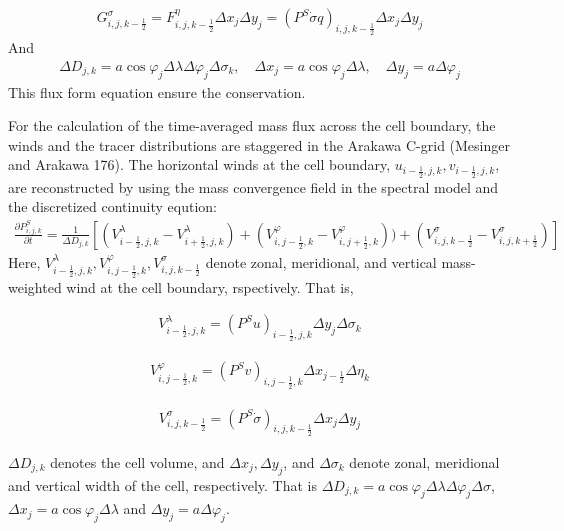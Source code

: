 \begin{eqnarray}G^{\sigma}_{i,j,k-\frac{1}{2}}=F^{\eta}_{i,j,k-\frac{1}{2}} \Delta x_{j} \Delta y_{j}=(P^{S} \dot{\sigma} q)_{i,j,k-\frac{1}{2}} \Delta x_{j} \Delta y_{j}\end{eqnarray} And
\begin{eqnarray}\Delta D_{j,k}=a \cos \varphi_{j} \Delta \lambda \Delta \varphi_{j} \Delta \sigma_{k},\quad \Delta x_{j}=a \cos \varphi_{j} \Delta \lambda,\quad \Delta y_{j}=a \Delta \varphi_{j}\end{eqnarray} This flux form
equation ensure the conservation.

For the calculation of the time-averaged mass flux across the cell boundary, the winds and the tracer distributions are staggered in the Arakawa C-grid (Mesinger and Arakawa 176). The horizontal winds
at the cell boundary, \(u_{i-\frac{1}{2},j,k}, v_{i-\frac{1}{2},j,k}\), are reconstructed by using the mass convergence field in the spectral model and the discretized continuity eqution:
\begin{eqnarray}\frac{\partial P^{S}_{i,j,k} }{\partial t}=\frac{1}{\Delta D_{j,k}}[(V^{\lambda}_{i-\frac{1}{2},j,k}-V^{\lambda}_{i+\frac{1}{2},j,k})+(V^{\varphi}_{i,j-\frac{1}{2},k}-V^{\varphi}_{i,j+\frac{1}{2},k}))+(V^{\sigma}_{i,j,k-\frac{1}{2}}-V^{\sigma}_{i,j,k+\frac{1}{2}})]\end{eqnarray}
Here, \(V^{\lambda}_{i-\frac{1}{2},j,k}, V^{\varphi}_{i,j-\frac{1}{2},k}, V^{\sigma}_{i,j,k-\frac{1}{2}}\) denote zonal, meridional, and vertical mass-weighted wind at the cell boundary, rspectively.
That is,

\begin{eqnarray}
V^{\lambda}_{i-\frac{1}{2},j,k}=(P^{S}u)_{i-\frac{1}{2},j,k} \Delta y_{j} \Delta \sigma_{k}
\end{eqnarray}

\begin{eqnarray}
V^{\varphi}_{i,j-\frac{1}{2},k}=(P^{S}v)_{i,j-\frac{1}{2},k} \Delta x_{j-\frac{1}{2}} \Delta \eta_{k}
\end{eqnarray}

\begin{eqnarray}
V^{\sigma}_{i,j,k-\frac{1}{2}}=(P^{S}\dot{\sigma})_{i,j,k-\frac{1}{2}} \Delta x_{j} \Delta y_{j}
\end{eqnarray}

\(\Delta D_{j,k}\) denotes the cell volume, and \(\Delta x_{j}, \Delta y_{j}\), and \(\Delta \sigma_{k}\) denote zonal, meridional and vertical width of the cell, respectively. That is
\(\Delta D_{j,k}=a \cos \varphi_{j}\Delta \lambda \Delta \varphi_{j} \Delta \sigma\), \(\Delta x_{j}=a \cos \varphi_{j} \Delta \lambda\) and \(\Delta y_{j}=a \Delta \varphi_{j}\).

